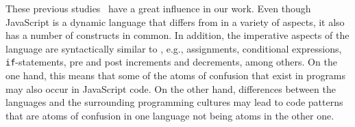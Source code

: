 
These previous studies~\cite{DBLP:conf/sigsoft/GopsteinIYDZYC17,DBLP:conf/msr/GopsteinZFC18}
have a great influence in our work. Even though JavaScript is a dynamic language that differs from \clang in a variety of aspects, it also has a number of constructs in common. In addition, the imperative aspects of the language are syntactically similar to \clang, e.g., assignments, conditional expressions, \texttt{if}-statements, pre and post increments and decrements, among others. On the one hand, this means that some of the atoms of confusion that exist in \clang programs may also occur in JavaScript code. On the other hand, differences between the languages and the surrounding programming cultures may lead to code patterns that are atoms of confusion in one language not being atoms in the other one.

